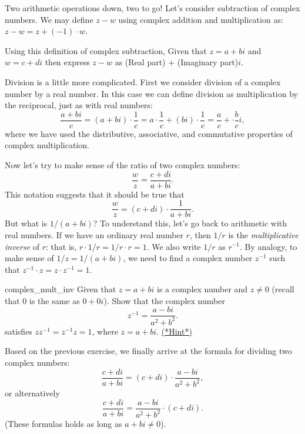 Two arithmetic operations down, two to go!  Let's consider subtraction of complex numbers. We may define $z - w$ using complex addition and multiplication as:  $z - w = z + (-1)\cdot w$.

\begin{exercise}{}
Using this definition of complex subtraction, Given that  $z = a + bi$ and $w = c + di$ then express $z - w$ as (Real part)  + (Imaginary part)$i$.
\end{exercise}

Division is a little more complicated. First we consider division of a complex number by a real number.  In this case we can define division as multiplication by the reciprocal, just as with real numbers:
\begin{equation*}\label{eq:complex:1}
\frac{a + bi}{c} = (a + bi) \cdot \frac{1}{c} = a \cdot \frac{1}{c} + (bi) \cdot \frac{1}{c} = \frac{a}{c} + \cdot \frac{b}{c}i , 
\end{equation*}
where we have used the distributive, associative, and commutative properties of complex multiplication. 

Now let's try to make sense of the ratio of two complex numbers: 
\[\frac{w}{z}=\frac{c+di} {a+bi}.\] 
This notation suggests that it should be true that  
\[\frac{w}{z}=(c+di)  \cdot \frac{1}{a+bi}. \]
 But what is $1/(a+bi)$?
To understand this, let's go back to arithmetic with real numbers. If we have an ordinary real number $r$, then $1/r$ is the \emph{multiplicative inverse} of $r$: that is, $r \cdot 1/r =1/r \cdot r = 1$. We also write $1/r$ as $r^{-1}$. By analogy, to make sense of $1/z = 1/(a+bi)$, we need to find a complex number $z^{-1}$ such that $z^{-1} \cdot z = z \cdot z^{-1} = 1$.

\begin{exercise}{complex_mult_inv}  Given that $z = a+bi$ is a complex number and $z \neq 0$ (recall that $0$ is the same as $0+0i$).  Show that the complex number
\[ z^{-1}=\frac{a-bi}{a^{2}+b^{2}}.\]
satisfies $zz^{-1}=z^{-1}z=1$, where $z=a+bi$.
\hyperref[sec:complex:hints]{(*Hint*)}
\end{exercise}
Based on the previous exercise, we finally arrive at the formula for dividing two complex numbers:
\[\frac{c+di}{a+bi}=
(c + di) \cdot \frac{a-bi}{a^2 + b^2}, \]
or alternatively
\[\frac{c+di}{a+bi}=  \frac{a-bi}{a^2 + b^2} \cdot (c + di).\]
(These formulas holds as long as $a+bi \neq 0$). 

